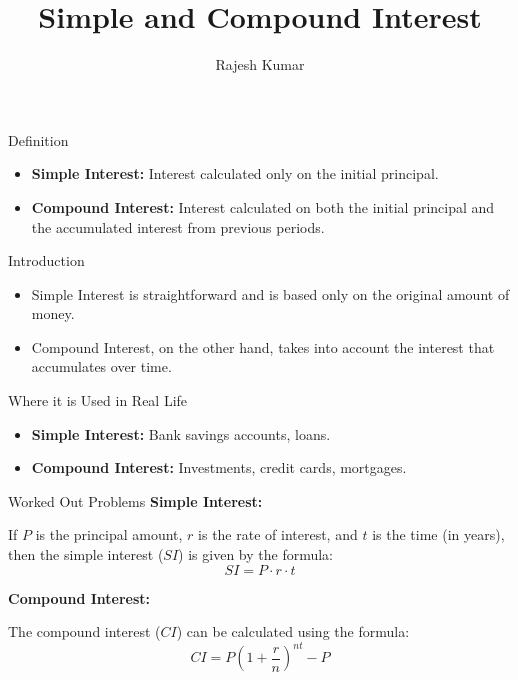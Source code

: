 
\title{Simple and Compound Interest}
\author{Rajesh Kumar}
\date{}

\begin{frame}
  \titlepage
\end{frame}


\begin{frame}{Definition}
  \begin{itemize}
    \item \textbf{Simple Interest:} Interest calculated only on the initial principal.
    \item \textbf{Compound Interest:} Interest calculated on both the initial principal and the accumulated interest from previous periods.
  \end{itemize}
\end{frame}

\begin{frame}{Introduction}
  \begin{itemize}
    \item Simple Interest is straightforward and is based only on the original amount of money.
    \item Compound Interest, on the other hand, takes into account the interest that accumulates over time.
  \end{itemize}
\end{frame}

\begin{frame}{Where it is Used in Real Life}
  \begin{itemize}
    \item \textbf{Simple Interest:} Bank savings accounts, loans.
    \item \textbf{Compound Interest:} Investments, credit cards, mortgages.
  \end{itemize}
\end{frame}

\begin{frame}{Worked Out Problems}
  \textbf{Simple Interest:}
  
  If $P$ is the principal amount, $r$ is the rate of interest, and $t$ is the time (in years), then the simple interest ($SI$) is given by the formula:
  \[ SI = P \cdot r \cdot t \]

  \textbf{Compound Interest:}
  
  The compound interest ($CI$) can be calculated using the formula:
  \[ CI = P \left(1 + \frac{r}{n}\right)^{nt} - P \]
\end{frame}

